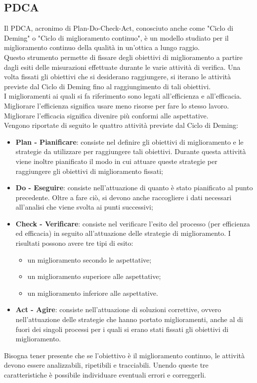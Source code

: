 \documentclass[../PianoDiQualifica.tex]{subfiles}
\begin{document}
\begin{appendices}

\section{PDCA}
	Il PDCA, acronimo di Plan-Do-Check-Act, conosciuto anche come "Ciclo di Deming" o "Ciclo di miglioramento continuo", è un modello studiato per il miglioramento continuo della qualità in un'ottica a lungo raggio.\\
	Questo strumento permette di fissare degli obiettivi di miglioramento a partire dagli esiti delle misurazioni effettuate durante le varie attività di verifica. Una volta fissati gli obiettivi che si desiderano raggiungere, si iterano le attività previste dal Ciclo di Deming fino al raggiungimento di tali obiettivi.\\
	I miglioramenti ai quali si fa riferimento sono legati all'efficienza e all'efficacia. Migliorare l'efficienza significa usare meno risorse per fare lo stesso lavoro. Migliorare l'efficacia significa divenire più conformi alle aspettative.\\
	Vengono riportate di seguito le quattro attività previste dal Ciclo di Deming:
	\begin{itemize}
		\item \textbf{Plan - Pianificare}: consiste nel definire gli obiettivi di miglioramento e le strategie da utilizzare per raggiungere tali obiettivi. Durante questa attività viene inoltre pianificato il modo in cui attuare queste strategie per raggiungere gli obiettivi di miglioramento fissati;
		\item \textbf{Do - Eseguire}: consiste nell'attuazione di quanto è stato pianificato al punto precedente. Oltre a fare ciò, si devono anche raccogliere i dati necessari all’analisi che viene svolta ai punti successivi;
		\item \textbf{Check - Verificare}: consiste nel verificare l'esito del processo (per efficienza ed efficacia) in seguito all'attuazione delle strategie di miglioramento. I risultati possono avere tre tipi di esito:
		\begin{itemize}
			\item un miglioramento secondo le aspettative;
			\item un miglioramento superiore alle aspettative;
			\item un miglioramento inferiore alle aspettative.
		\end{itemize}
		\item \textbf{Act - Agire}: consiste nell'attuazione di soluzioni correttive, ovvero nell'attuazione delle strategie che hanno portato miglioramenti, anche al di fuori dei singoli processi per i quali si erano stati fissati gli obiettivi di miglioramento.
	\end{itemize}
	Bisogna tener presente che se l'obiettivo è il miglioramento continuo, le attività devono essere analizzabili, ripetibili e tracciabili. 
	Unendo queste tre caratteristiche è possibile individuare eventuali errori e correggerli.
\end{appendices}
\end{document}
